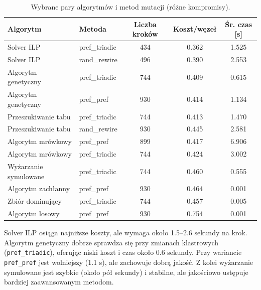 \begin{table}[H]
  \centering
  \caption{Wybrane pary algorytmów i metod mutacji (różne kompromisy).}
  \label{tab:dyn-synth-selected-best}
  \begin{tabular}{llccc}
    \toprule
    \textbf{Algorytm}     & \textbf{Metoda} & \textbf{Liczba kroków} & \textbf{Koszt/węzeł} & \textbf{Śr. czas [s]} \\
    \midrule
    Solver ILP            & pref\_triadic   & 434                    & 0.362                & 1.525                 \\
    Solver ILP            & rand\_rewire    & 496                    & 0.390                & 2.553                 \\
    Algorytm genetyczny   & pref\_triadic   & 744                    & 0.409                & 0.615                 \\
    Algorytm genetyczny   & pref\_pref      & 930                    & 0.414                & 1.134                 \\
    Przeszukiwanie tabu   & pref\_triadic   & 744                    & 0.413                & 1.470                 \\
    Przeszukiwanie tabu   & rand\_rewire    & 930                    & 0.445                & 2.581                 \\
    Algorytm mrówkowy     & pref\_pref      & 899                    & 0.417                & 6.906                 \\
    Algorytm mrówkowy     & pref\_triadic   & 744                    & 0.424                & 3.002                 \\
    Wyżarzanie symulowane & pref\_triadic   & 744                    & 0.460                & 0.555                 \\
    Algorytm zachłanny    & pref\_pref      & 930                    & 0.464                & 0.001                 \\
    Zbiór dominujący      & pref\_triadic   & 744                    & 0.457                & 0.005                 \\
    Algorytm losowy       & pref\_pref      & 930                    & 0.754                & 0.001                 \\
    \bottomrule
  \end{tabular}
\end{table}

Solver ILP osiąga najniższe koszty, ale wymaga około 1.5--2.6 sekundy na krok. Algorytm genetyczny dobrze sprawdza się przy zmianach klastrowych (\texttt{pref\_triadic}), oferując niski koszt i czas około 0.6 sekundy. Przy wariancie \texttt{pref\_pref} jest wolniejszy (1.1 s), ale zachowuje dobrą jakość. Z kolei wyżarzanie symulowane jest szybkie (około pół sekundy) i stabilne, ale jakościowo ustępuje bardziej zaawansowanym metodom.


